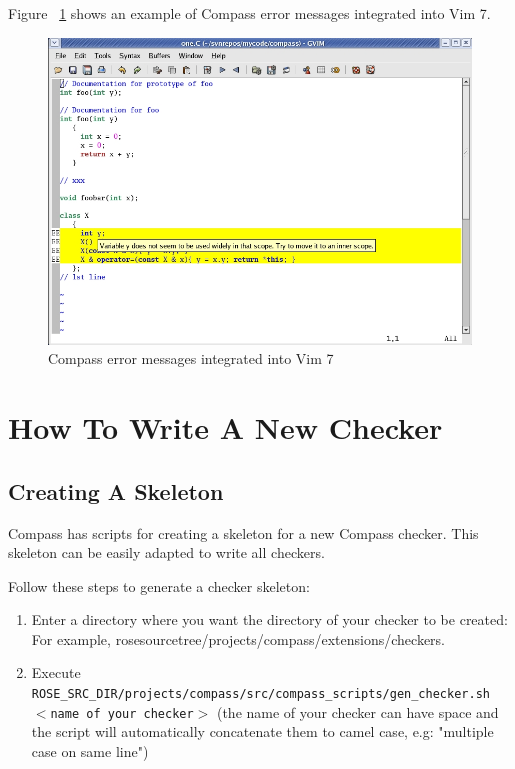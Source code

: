 Figure ~\ref{Compass_VIM7_Screenshot} shows an example of Compass error
messages integrated into Vim 7.
\begin{figure}[!htp]
\hspace{-0.7in}
\includegraphics[width=7in]{compass_vim7.jpg}
\caption{Compass error messages integrated into Vim 7}
\label{Compass_VIM7_Screenshot}
\end{figure}

\clearpage
\section{How To Write A New Checker}

\subsection{Creating A Skeleton}

Compass has scripts for creating a skeleton for a new Compass
checker. This skeleton can be easily adapted to write all checkers.

Follow these steps to generate a checker skeleton:
\begin{enumerate}
   \item Enter a directory where you want the directory of your checker to
   be created: For example,
   rosesourcetree/projects/compass/extensions/checkers.
   \item Execute {\tt
   ROSE\_SRC\_DIR/projects/compass/src/compass\_scripts/gen\_checker.sh
   $<$name of your checker$>$} (the name of your checker can have space and
   the script will automatically concatenate them to camel case, e.g: 
   "multiple case on same line")
\end{enumerate}

